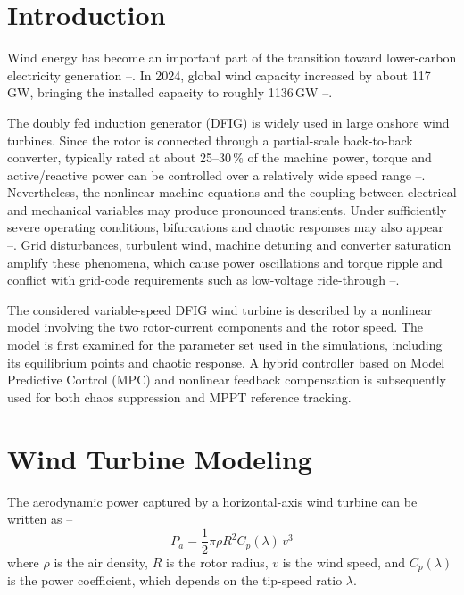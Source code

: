 \documentclass[conference]{IEEEtran}
\begin{document}
\section{Introduction}
Wind energy has become an important part of the transition toward lower-carbon electricity generation \cite{IEA2024}--\cite{UNEP2024}. In 2024, global wind capacity increased by about 117\,GW, bringing the installed capacity to roughly 1136\,GW \cite{GWEC2024}--\cite{Heier2020}.

The doubly fed induction generator (DFIG) is widely used in large onshore wind turbines. Since the rotor is connected through a partial-scale back-to-back converter, typically rated at about 25--30\,\% of the machine power, torque and active/reactive power can be controlled over a relatively wide speed range \cite{Pena1996}--\cite{Chhipa2022}. Nevertheless, the nonlinear machine equations and the coupling between electrical and mechanical variables may produce pronounced transients. Under sufficiently severe operating conditions, bifurcations and chaotic responses may also appear \cite{Xu2007}--\cite{Qiao2009}. Grid disturbances, turbulent wind, machine detuning and converter saturation amplify these phenomena, which cause power oscillations and torque ripple and conflict with grid-code requirements such as low-voltage ride-through \cite{Nian2011}--\cite{Tsili2009}.

The considered variable-speed DFIG wind turbine is described by a nonlinear model involving the two rotor-current components and the rotor speed. The model is first examined for the parameter set used in the simulations, including its equilibrium points and chaotic response. A hybrid controller based on Model Predictive Control (MPC) and nonlinear feedback compensation is subsequently used for both chaos suppression and MPPT reference tracking.

\section{Wind Turbine Modeling}
The aerodynamic power captured by a horizontal-axis wind turbine can be written as \cite{Mechter2016}--\cite{Bouguettah2024}
\begin{equation}
P_a = \frac{1}{2}\pi\rho R^2 C_p(\lambda)\, v^3
\end{equation}
where $\rho$ is the air density, $R$ is the rotor radius, $v$ is the wind speed, and $C_p(\lambda)$ is the power coefficient, which depends on the tip-speed ratio $\lambda$.
\end{document}
